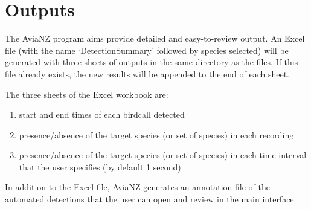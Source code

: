 \documentclass{article}
\begin{document}
\section{Outputs}
\label{sec:outputs}
The AviaNZ program aims provide detailed and easy-to-review output. An Excel file (with the name `DetectionSummary' followed by species selected) will be generated with three sheets of outputs in the same directory as the files. If this file already exists, the new results will be appended to the end of each sheet. 

The three sheets of the Excel workbook are:

\begin{enumerate}
\item start and end times of each birdcall detected
\item presence/absence of the target species (or set of species) in each recording
\item  presence/absence of the target species (or set of species) in each time interval that the user specifies (by default 1 second)
\end{enumerate}

In addition to the Excel file, AviaNZ generates an annotation file of the automated detections that  the user can open and review in the main interface.
\end{document}
